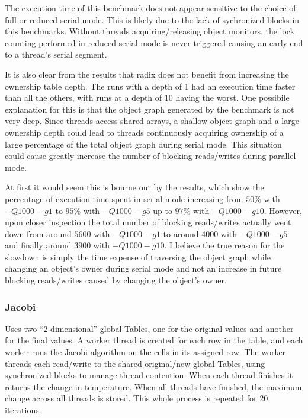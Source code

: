 The execution time of this benchmark does not appear sensitive to the
choice of full or reduced serial mode.  This is likely due to the lack
of sychronized blocks in this benchmarks.  Without threads
acquiring/releasing object monitors, the lock counting performed in
reduced serial mode is never triggered causing an early end to a
thread's serial segment.

It is also clear from the results that radix does not benefit from
increasing the ownership table depth.  The runs with a depth of 1 had
an execution time faster than all the others, with runs at a depth of
10 having the worst.  One possibile explanation for this is that the
object graph generated by the benchmark is not very deep.  Since
threads access shared arrays, a shallow object graph and a large
ownership depth could lead to threads continuously acquiring ownership
of a large percentage of the total object graph during serial mode.
This situation could cause greatly increase the number of blocking
reads/writes during parallel mode.

At first it would seem this is bourne out by the results, which show
the percentage of execution time spent in serial mode increasing from
$50\%$ with $-Q1000 -g1$ to $95\%$ with $-Q1000 -g5$ up to $97\%$ with
$-Q1000 -g10$.  However, upon closer inspection the total number of
blocking reads/writes actually went down from around $5600$ with
$-Q1000 -g1$ to around $4000$ with $-Q1000 -g5$ and finally around
$3900$ with $-Q1000 -g10$.  I believe the true reason for the slowdown
is simply the time expense of traversing the object graph while
changing an object's owner during serial mode and not an increase in
future blocking reads/writes caused by changing the object's owner.

\subsubsection{Jacobi}

Uses two ``2-dimensional'' global Tables, one for the original values
and another for the final values.  A worker thread is created for each
row in the table, and each worker runs the Jacobi algorithm on the
cells in its assigned row.  The worker threads each read/write to the
shared original/new global Tables, using synchronized blocks to manage
thread contention.  When each thread finishes it returns the change in
temperature.  When all threads have finished, the maximum change
across all threads is stored.  This whole process is repeated for 20
iterations.

